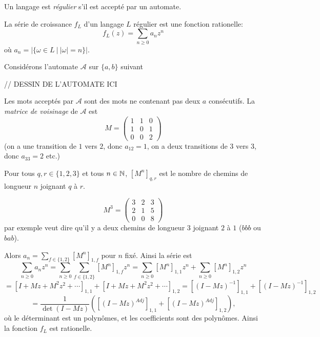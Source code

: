   \begin{defi}
    Un langage est \emph{régulier}  s'il est accepté par un automate.
  \end{defi}

  


  \begin{prop}
    La série de croissance $f_L$ d'un langage $L$ régulier est une fonction rationelle:
      \[f_L(z) = \sum_{n \geq 0}a_nz^n\]
    où $a_n = \left| \{ \omega \in L\ |\ |\omega| = n\} \right|$. 
  \end{prop}

  \begin{preuve}
    Considérons l'automate $\mathcal{A}$ sur $\{a, b\}$ suivant

    // DESSIN DE L'AUTOMATE ICI

    Les mots acceptés par $\mathcal{A}$ sont des mots ne contenant pas deux $a$ consécutifs. La \emph{matrice
      de voisinage} de $\mathcal{A}$ est 
      \[
      M = 
      \begin{pmatrix}
        1 & 1 & 0 \\ 1 & 0 & 1 \\ 0 & 0 & 2
      \end{pmatrix}
      \]
    (on a une transition de $1$ vers $2$, donc $a_{12} = 1$, on a deux transitions de $3$ vers $3$, donc
    $a_{33} = 2$ etc.)

    Pour tous $q, r \in \{1, 2, 3\}$ et tous $n \in \mathbb{N}$, $[M^n]_{q,r}$ est le nombre de chemins de longueur
    $n$ joignant $q$ à $r$.

    \[
    M^3 = 
    \begin{pmatrix}
      3 & 2 & 3 \\ 2 & 1 & 5 \\ 0 & 0 & 8
    \end{pmatrix}
    \]
    par exemple veut dire qu'il y a deux chemins de longueur $3$ joignant $2$ à $1$ ($bbb$ ou $bab$).

    Alors $a_n = \sum_{f \in \{1, 2\}} [M^n]_{1, f}$ pour $n$ fixé. Ainsi la série est
      \[\sum_{n \geq 0}a_nz^n = \sum_{n \geq 0} \sum_{f \in \{1, 2\}}[M^n]_{1, f}z^n = \sum_{n \geq 0}
      [M^n]_{1,1}z^n + \sum_{n \geq 0} [M^n]_{1,2} z^n \]
      \[ = [I + Mz + M^2z^2 + \cdots]_{1,1} + [I + Mz + M^2z^2+\cdots]_{1,2} = [(I-Mz)^{-1}]_{1,1} +
      [(I-Mz)^{-1}]_{1,2}\]
      \[= \frac{1}{\det(I-Mz)} \left( \left[(I-Mz)^{Adj}\right]_{1,1} +
        \left[(I-Mz)^{Adj}\right]_{1,2}\right),\]
    où le déterminant est un polynômes, et les coefficients sont des polynômes. Ainsi la fonction $f_L$ est rationelle.
  \end{preuve}

